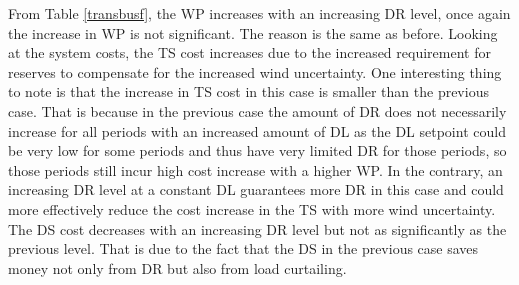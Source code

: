 From Table \ref{transbusf}, the WP increases with an increasing DR level, once again the increase in WP is not significant. The reason is the same as before. Looking at the system costs, the TS cost increases due to the increased requirement for reserves to compensate for the increased wind uncertainty. One interesting thing to note is that the increase in TS cost in this case is smaller than the previous case. That is because in the previous case the amount of DR does not necessarily increase for all periods with an increased amount of DL as the DL setpoint could be very low for some periods and thus have very limited DR for those periods, so those periods still incur high cost increase with a higher WP. In the contrary, an increasing DR level at a constant DL guarantees more DR in this case and could more effectively reduce the cost increase in the TS with more wind uncertainty. The DS cost decreases with an increasing DR level but not as significantly as the previous level. That is due to the fact that the DS in the previous case saves money not only from DR but also from load curtailing. 


